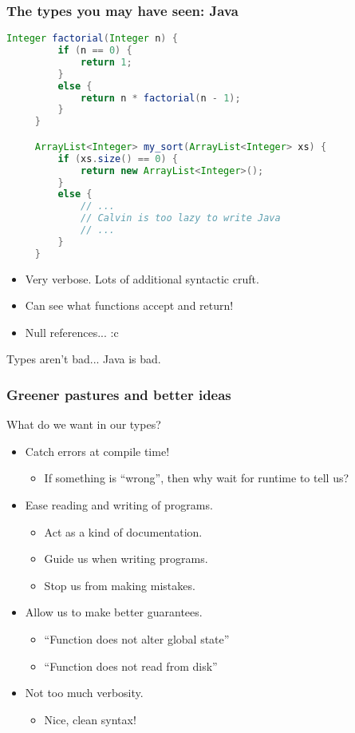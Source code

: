 \documentclass{beamer}
\begin{document}
\begin{frame}[fragile]
  \frametitle{The types you may have seen: Java}

  \begin{lstlisting}[frame=single, language=Java, breaklines=true, basicstyle=\ttfamily\tiny]
     Integer factorial(Integer n) {
         if (n == 0) {
             return 1;
         }
         else {
             return n * factorial(n - 1);
         }
     }

     ArrayList<Integer> my_sort(ArrayList<Integer> xs) {
         if (xs.size() == 0) {
             return new ArrayList<Integer>();
         }
         else {
             // ...
             // Calvin is too lazy to write Java
             // ...
         }
     }
   \end{lstlisting}

   \begin{itemize}
   \pause
   \item Very verbose. Lots of additional syntactic cruft.
   \pause
   \item Can see what functions accept and return!
   \pause
   \item Null references... :c
   \end{itemize}

   \pause

   Types aren't bad... \pause Java is bad.
\end{frame}

\begin{frame}
  \frametitle{Greener pastures and better ideas}

  What do we want in our types?

  \begin{itemize}
    \pause
  \item Catch errors at compile time!
    \begin{itemize}
    \item If something is ``wrong'', then why wait for runtime to tell us?
    \end{itemize}
    \pause
  \item Ease reading and writing of programs.
    \begin{itemize}
    \item Act as a kind of documentation.
    \item Guide us when writing programs.
    \item Stop us from making mistakes.
    \end{itemize}
    \pause
  \item Allow us to make better guarantees.
    \begin{itemize}
    \item ``Function does not alter global state''
    \item ``Function does not read from disk''
    \end{itemize}
    \pause
  \item Not too much verbosity.
    \begin{itemize}
    \item Nice, clean syntax!
    \end{itemize}
  \end{itemize}   
\end{frame}
\end{document}
